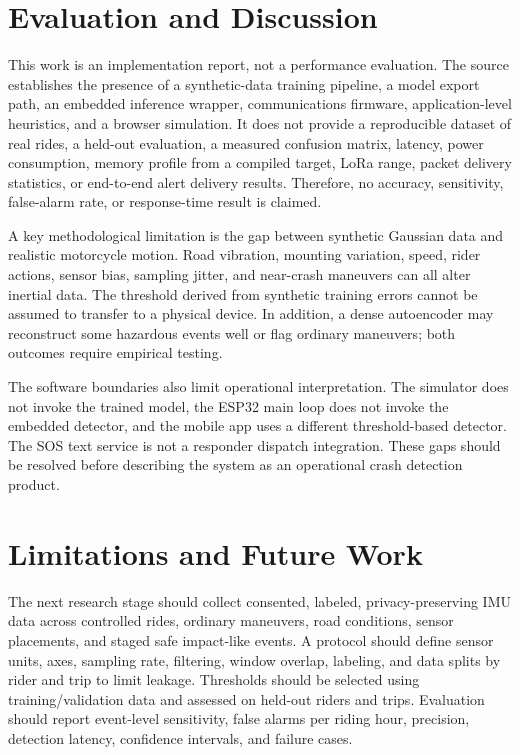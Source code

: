 \documentclass[conference]{IEEEtran}
\begin{document}
\section{Evaluation and Discussion}
This work is an implementation report, not a performance evaluation. The source establishes the presence of a synthetic-data training pipeline, a model export path, an embedded inference wrapper, communications firmware, application-level heuristics, and a browser simulation. It does not provide a reproducible dataset of real rides, a held-out evaluation, a measured confusion matrix, latency, power consumption, memory profile from a compiled target, LoRa range, packet delivery statistics, or end-to-end alert delivery results. Therefore, no accuracy, sensitivity, false-alarm rate, or response-time result is claimed.

A key methodological limitation is the gap between synthetic Gaussian data and realistic motorcycle motion. Road vibration, mounting variation, speed, rider actions, sensor bias, sampling jitter, and near-crash maneuvers can all alter inertial data. The threshold derived from synthetic training errors cannot be assumed to transfer to a physical device. In addition, a dense autoencoder may reconstruct some hazardous events well or flag ordinary maneuvers; both outcomes require empirical testing.

The software boundaries also limit operational interpretation. The simulator does not invoke the trained model, the ESP32 main loop does not invoke the embedded detector, and the mobile app uses a different threshold-based detector. The SOS text service is not a responder dispatch integration. These gaps should be resolved before describing the system as an operational crash detection product.

\section{Limitations and Future Work}
The next research stage should collect consented, labeled, privacy-preserving IMU data across controlled rides, ordinary maneuvers, road conditions, sensor placements, and staged safe impact-like events. A protocol should define sensor units, axes, sampling rate, filtering, window overlap, labeling, and data splits by rider and trip to limit leakage. Thresholds should be selected using training/validation data and assessed on held-out riders and trips. Evaluation should report event-level sensitivity, false alarms per riding hour, precision, detection latency, confidence intervals, and failure cases.
\end{document}
